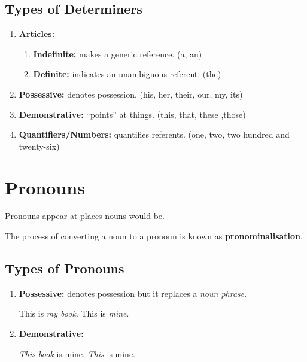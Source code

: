 \documentclass[../main.tex]{subfiles}
\begin{document}
	\subsection{Types of Determiners}
	\begin{enumerate}
		\item \textbf{Articles:} \begin{enumerate}
			\item \textbf{Indefinite:} makes a generic reference. (a, an)
			\item \textbf{Definite:} indicates an unambiguous referent. (the)
		\end{enumerate}
		\item \textbf{Possessive:} denotes possession. (his, her, their, our, my, its)
		\item \textbf{Demonstrative:} ``points'' at things. (this, that, these ,those)
		\item \textbf{Quantifiers/Numbers:} quantifies referents. (one, two, two hundred and twenty-six)
	\end{enumerate}

	\section{Pronouns}
	Pronouns appear at places nouns would be.
	
	The process of converting a noun to a pronoun is known as \textbf{pronominalisation}.
	
	\subsection{Types of Pronouns}
	\begin{enumerate}
		\item \textbf{Possessive:} denotes possession but it replaces a \textit{noun phrase}. \begin{exe}
			\ex \begin{xlist}
				\ex This is \textit{my book}.
				\ex This is \textit{mine}.
			\end{xlist}
		\end{exe}
		\item \textbf{Demonstrative:} 
		\begin{exe}
			\ex \begin{xlist}
				\ex \textit{This book} is mine.
				\ex \textit{This} is mine.
			\end{xlist}
		\end{exe}
	\end{enumerate}
	
\end{document}
